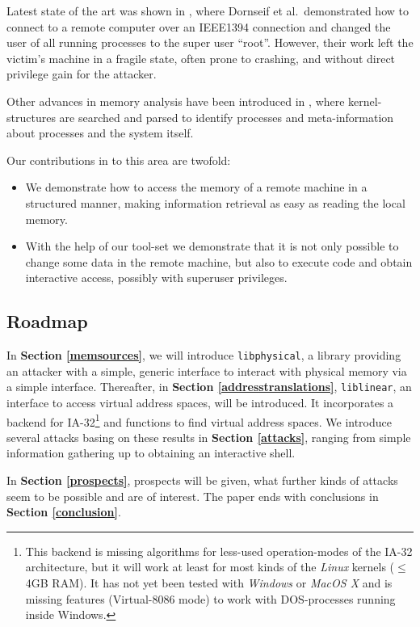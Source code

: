 Latest state of the art was shown in \cite{cansecwest_firewire:2005}, where
Dornseif et al.~demonstrated how to connect to a remote computer over an
IEEE1394 connection and changed the user of all running processes to the super
user "`root"'. However, their work left the victim's machine in a fragile state,
often prone to crashing, and without direct privilege gain for the attacker.

Other advances in memory analysis have been introduced in
\cite{finding_digital_evidence_in_physical_memory:2006}, where kernel-structures
are searched and parsed to identify processes and meta-in\-for\-ma\-tion about
processes and the system itself.

Our contributions in to this area are twofold: 

\begin{itemize} 

\item We demonstrate how to access the memory of a remote machine in a
structured manner, making information retrieval as easy as reading the local
memory.

\item With the help of our tool-set we demonstrate that it is not only possible
to change some data in the remote machine, but also to execute code and obtain
interactive access, possibly with superuser privileges.

\end{itemize}

\subsection{Roadmap}

In \textbf{Section \ref{memsources}}, we will introduce \texttt{libphysical}, a
library providing an attacker with a simple, generic interface to interact with
physical memory via a simple interface.  Thereafter, in \textbf{Section
\ref{addresstranslations}}, \texttt{liblinear}, an interface to access virtual
address spaces, will be introduced. It incorporates a backend for
IA-32\footnote{This backend is missing algorithms for less-used operation-modes
of the IA-32 architecture, but it will work at least for most kinds of the
\emph{Linux} kernels ($\leq$ 4GB RAM). It has not yet been tested with
\emph{Windows} or \emph{MacOS X} and is missing features (Virtual-8086 mode) to
work with DOS-processes running inside Windows.} and functions to find virtual
address spaces.  We introduce several attacks basing on these results in
\textbf{Section \ref{attacks}}, ranging from simple information gathering up to
obtaining an interactive shell.

In \textbf{Section \ref{prospects}}, prospects will be given, what further kinds
of attacks seem to be possible and are of interest. The paper ends with
conclusions in \textbf{Section \ref{conclusion}}.

